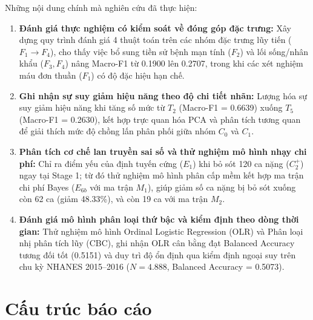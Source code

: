 Những nội dung chính mà nghiên cứu đã thực hiện:
\begin{enumerate}
    \item \textbf{Đánh giá thực nghiệm có kiểm soát về đóng góp đặc trưng:} Xây dựng quy trình đánh giá 4 thuật toán trên các nhóm đặc trưng lũy tiến ($F_1 \to F_4$), cho thấy việc bổ sung tiền sử bệnh mạn tính ($F_2$) và lối sống/nhân khẩu ($F_3, F_4$) nâng Macro-F1 từ 0.1900 lên 0.2707, trong khi các xét nghiệm máu đơn thuần ($F_1$) có độ đặc hiệu hạn chế.
    \item \textbf{Ghi nhận sự suy giảm hiệu năng theo độ chi tiết nhãn:} Lượng hóa sự suy giảm hiệu năng khi tăng số mức từ $T_2$ (Macro-F1 = 0.6639) xuống $T_5$ (Macro-F1 = 0.2630), kết hợp trực quan hóa PCA và phân tích tương quan để giải thích mức độ chồng lấn phân phối giữa nhóm $C_0$ và $C_1$.
    \item \textbf{Phân tích cơ chế lan truyền sai số và thử nghiệm mô hình nhạy chi phí:} Chỉ ra điểm yếu của định tuyến cứng ($E_1$) khi bỏ sót 120 ca nặng ($C_2^+$) ngay tại Stage 1; từ đó thử nghiệm mô hình phân cấp mềm kết hợp ma trận chi phí Bayes ($E_{6b}$ với ma trận $M_1$), giúp giảm số ca nặng bị bỏ sót xuống còn 62 ca (giảm 48.33\%), và còn 19 ca với ma trận $M_2$.
    \item \textbf{Đánh giá mô hình phân loại thứ bậc và kiểm định theo dòng thời gian:} Thử nghiệm mô hình Ordinal Logistic Regression (OLR) và Phân loại nhị phân tích lũy (CBC), ghi nhận OLR cân bằng đạt Balanced Accuracy tương đối tốt (0.5151) và duy trì độ ổn định qua kiểm định ngoại suy trên chu kỳ NHANES 2015--2016 ($N = 4.888$, Balanced Accuracy = 0.5073).
\end{enumerate}

\section{Cấu trúc báo cáo}
\label{sec:bo-cuc-khoa-luan}

